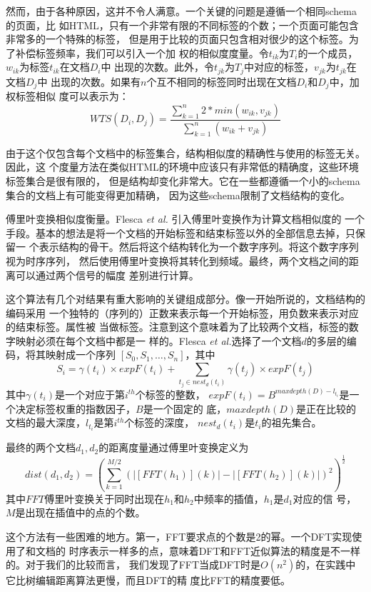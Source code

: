然而，由于各种原因，这并不令人满意。一个关键的问题是遵循一个相同schema的页面，比
如HTML，只有一个非常有限的不同标签的个数；一个页面可能包含非常多的一个特殊的标签，
但是用于比较的页面只包含相对很少的这个标签。为了补偿标签频率，我们可以引入一个加
权的相似度度量。令$t_{ik}$为$T_i$的一个成员，$w_{ik}$为标签$t_{ik}$在文档$D_i$中
出现的次数。此外，令$t_{jk}$为$T_j$中对应的标签，$v_{jk}$为$t_{jk}$在文档$D_j$中
出现的次数。如果有$n$个互不相同的标签同时出现在文档$D_i$和$D_j$中，加权标签相似
度可以表示为：
\[
WTS(D_i,D_j)=\frac{\sum_{k=1}^n2*min(w_{ik}, v_{jk})}{\sum_{k=1}^n(w_{ik}+v_{jk})}
\]

由于这个仅包含每个文档中的标签集合，结构相似度的精确性与使用的标签无关。因此，这
个度量方法在类似HTML的环境中应该只有非常低的精确度，这些环境标签集合是很有限的，
但是结构却变化非常大。它在一些都遵循一个小的schema集合的文档上有可能变得更加精确，
因为这些schema限制了文档结构的变化。

傅里叶变换相似度衡量。Flesca \textit{et al.} 引入傅里叶变换作为计算文档相似度的
一个手段。基本的想法是将一个文档的开始标签和结束标签以外的全部信息去掉，只保留一
个表示结构的骨干。然后将这个结构转化为一个数字序列。将这个数字序列视为时序序列，
然后使用傅里叶变换将其转化到频域。最终，两个文档之间的距离可以通过两个信号的幅度
差别进行计算。

这个算法有几个对结果有重大影响的关键组成部分。像一开始所说的，文档结构的编码采用
一个独特的（序列的）正数来表示每一个开始标签，用负数来表示对应的结束标签。属性被
当做标签。注意到这个意味着为了比较两个文档，标签的数字映射必须在每个文档中都是一
样的。Flesca \textit{et al.}选择了一个文档$d$的多层的编码，将其映射成一个序列
$[S_0,S_1,\dots,S_n]$，其中
\[
S_i=\gamma(t_i)\times expF(t_i) + \sum_{t_j\in nest_d(t_i)}\gamma(t_j)\times expF(t_j)
\]
其中$\gamma(t_i)$是一个对应于第$i^{th}$个标签的整数，
$expF(t_i)=B^{maxdepth(D)-l_{t_i}}$是一个决定标签权重的指数因子，$B$是一个固定的
底，$maxdepth(D)$是正在比较的文档的最大深度，$l_{t_i}$是第$i^{th}$个标签的深度，
$nest_d(t_i)$是$t_i$的祖先集合。

最终的两个文档$d_1,d_2$的距离度量通过傅里叶变换定义为
\[
dist(d_1,d_2)=(\sum_{k=1}^{M/2}(|[FFT(h_{1})](k)|-|[FFT(h_2)](k)|)^2)^{\frac{1}{2}}
\]
其中$FFT$傅里叶变换关于同时出现在$h_1$和$h_2$中频率的插值，$h_1$是$d_1$对应的信
号，$M$是出现在插值中的点的个数。

这个方法有一些困难的地方。第一，FFT要求点的个数是2的幂。一个DFT实现使用了和文档的
时序表示一样多的点，意味着DFT和FFT近似算法的精度是不一样的。对于我们的比较而言，
我们发现了FFT当成DFT时是$O(n^2)$的，在实践中它比树编辑距离算法更慢，而且DFT的精
度比FFT的精度要低。

